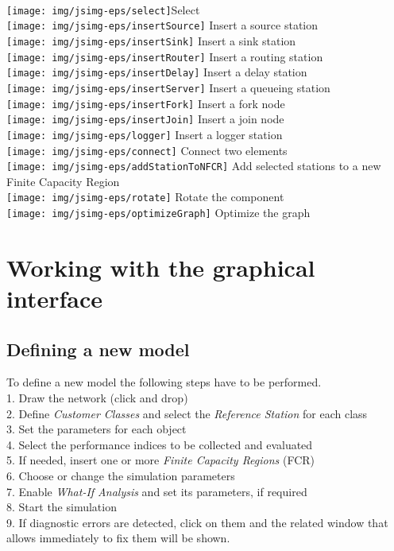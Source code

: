 \\
\texttt{[image: img/jsimg-eps/select]}Select\\
\texttt{[image: img/jsimg-eps/insertSource]} Insert a source
station\\
\texttt{[image: img/jsimg-eps/insertSink]} Insert a sink station\\
\texttt{[image: img/jsimg-eps/insertRouter]} Insert a routing
station\\
\texttt{[image: img/jsimg-eps/insertDelay]} Insert a delay station\\
\texttt{[image: img/jsimg-eps/insertServer]} Insert a queueing station\\
\texttt{[image: img/jsimg-eps/insertFork]} Insert a fork node\\
\texttt{[image: img/jsimg-eps/insertJoin]}  Insert a join node\\
\texttt{[image: img/jsimg-eps/logger]}  Insert a logger station\\
\texttt{[image: img/jsimg-eps/connect]}  Connect two elements\\
\texttt{[image: img/jsimg-eps/addStationToNFCR]}  Add selected
stations to a new Finite Capacity
Region\\
\texttt{[image: img/jsimg-eps/rotate]}  Rotate the component\\
\texttt{[image: img/jsimg-eps/optimizeGraph]}  Optimize the graph\\

\section{Working with the graphical interface}
\subsection{Defining a new model} \label{sec:DefiningANewModel}
To define a new model the following steps have to be performed.\\
1. Draw the network (click and drop) \\
2. Define \emph{Customer Classes} and select the \emph{Reference Station} for each
class\\
3. Set the parameters for each object\\
4. Select the performance indices to be collected and evaluated\\
5. If needed, insert one or more \emph{Finite Capacity Regions} (FCR)\\
6. Choose or change the simulation parameters\\
7. Enable \emph{What-If Analysis} and set its parameters, if required\\
8. Start the simulation\\
9. If diagnostic errors are detected, click on them and the
related window that allows immediately to fix them will be
shown.\\

